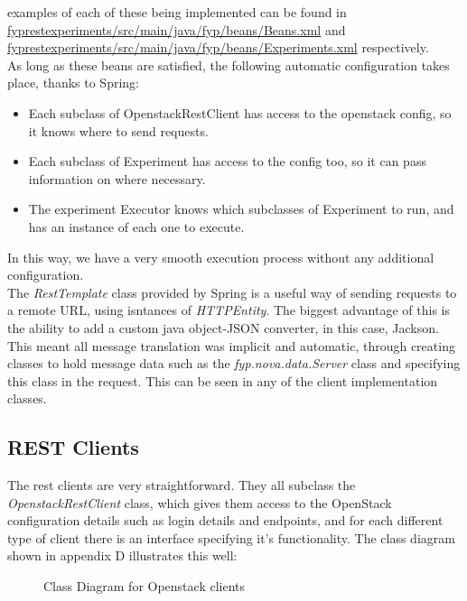 examples of each of these being implemented can be found in \url{fyprestexperiments/src/main/java/fyp/beans/Beans.xml} and \url{fyprestexperiments/src/main/java/fyp/beans/Experiments.xml} respectively. \\
As long as these beans are satisfied, the following automatic configuration takes place, thanks to Spring:
\begin{itemize}
\item Each subclass of OpenstackRestClient has access to the openstack config, so it knows where to send requests. 
\item Each subclass of Experiment has access to the config too, so it can pass information on where necessary.  
\item The experiment Executor knows which subclasses of Experiment to run, and has an instance of each one to execute. 
\end{itemize}

In this way, we have a very smooth execution process without any additional configuration. \\

The \textit{RestTemplate}\cite{resttemplate} class provided by Spring is a useful way of sending requests to a remote URL, using isntances of \textit{HTTPEntity}\cite{httpentity}. The biggest advantage of this is the ability to add a custom java object-JSON converter, in this case, Jackson\cite{jackson}. This meant all message translation was implicit and automatic, through creating classes to hold message data such as the \textit{fyp.nova.data.Server} class and specifying this class in the request. This can be seen in any of the client implementation classes.

\subsection{REST Clients}

The rest clients are very straightforward. They all subclass the \textit{OpenstackRestClient} class, which gives them access to the OpenStack configuration details such as login details and endpoints, and for each different type of client there is an interface specifying it's functionality. The class diagram shown in appendix D illustrates this well:

\begin{figure}[ht]
\centering
{}
\caption{Class Diagram for Openstack clients} 
\end{figure}

